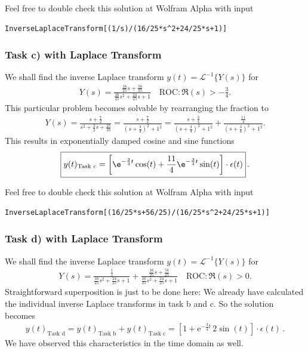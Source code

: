 Feel free to double check this solution at Wolfram Alpha with input
\begin{verbatim}
InverseLaplaceTransform[(1/s)/(16/25*s^2+24/25*s+1)]
\end{verbatim}

\subsubsection{Task c) with Laplace Transform}
We shall find the inverse Laplace transform $y(t) = \mathcal{L}^{-1}\{Y(s)\}$
for
\begin{align}
Y(s) =
\frac{\frac{16}{25} s + \frac{56}{25}}{\frac{16}{25} s^2 + \frac{24}{25} s + 1}
\quad \text{ROC}: \Re(s) > -\frac{3}{4}.
\end{align}
This particular problem becomes solvable by rearranging the fraction to
\begin{align}
Y(s) =
\frac{s + \frac{7}{2}}{s^2 + \frac{3}{2} s + \frac{25}{16}} =
\frac{s + \frac{7}{2}}{(s + \frac{3}{4})^2 + 1^2}
=\frac{s + \frac{3}{4}}{(s + \frac{3}{4})^2 + 1^2}
+\frac{\frac{11}{4}}{(s + \frac{3}{4})^2 + 1^2}.
\end{align}
This results in exponentially damped cosine and sine functions
\begin{align}
\boxed{y(t)_\text{Task c} =
\left[\e^{-\frac{3}{4} t} \cos(t)
+\frac{11}{4}\e^{-\frac{3}{4} t} \sin(t) \right] \cdot \epsilon(t)}\,.
\end{align}

Feel free to double check this solution at Wolfram Alpha with input
\begin{verbatim}
InverseLaplaceTransform[(16/25*s+56/25)/(16/25*s^2+24/25*s+1)]
\end{verbatim}


\subsubsection{Task d) with Laplace Transform}
We shall find the inverse Laplace transform $y(t) = \mathcal{L}^{-1}\{Y(s)\}$
for
\begin{align}
Y(s) = \frac{\frac{1}{s}}{\frac{16}{25} s^2 + \frac{24}{25} s + 1}+
\frac{\frac{16}{25} s + \frac{56}{25}}{\frac{16}{25} s^2 + \frac{24}{25} s + 1}
\quad \text{ROC}: \Re(s) > 0.
\end{align}
Straightforward superposition is just to be done here:
We already have calculated the individual inverse Laplace transforms in task b
and c. So the solution becomes
\begin{align}
\boxed{y(t)_\text{Task d} = y(t)_\text{Task b} + y(t)_\text{Task c}
= \left[1+\mathrm{e}^{-\frac{3}{4} t} \, 2 \sin(t) \right] \cdot \epsilon(t)
}\,.
\end{align}
We have observed this characteristics in the time domain as well.

